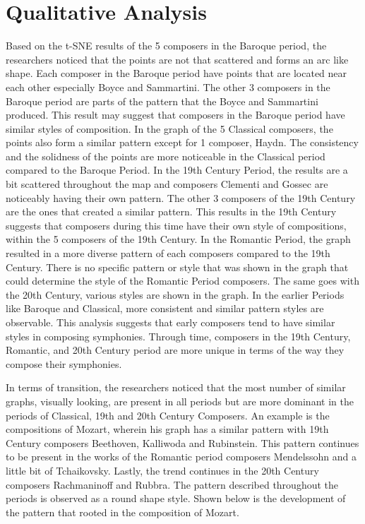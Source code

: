 \section{Qualitative Analysis}
Based on the t-SNE results of the 5 composers in the Baroque period, the researchers noticed that the points are not that scattered and forms an arc like shape. Each composer in the Baroque period have points that are located near each other especially Boyce and Sammartini. The other 3 composers in the Baroque period are parts of the pattern that the Boyce and Sammartini produced.  This result may suggest that composers in the Baroque period have similar styles of composition. In the graph of the 5 Classical composers, the points also form a similar pattern except for 1 composer, Haydn. The consistency and the solidness of the points are more noticeable in the Classical period compared to the Baroque Period. In the 19th Century Period, the results are a bit scattered throughout the map and composers Clementi and Gossec are noticeably having their own pattern. The other 3 composers of the 19th Century are the ones that created a similar pattern. This results in the 19th Century suggests that composers during this time have their own style of compositions, within the 5 composers of the 19th Century. In the Romantic Period, the graph resulted in a more diverse pattern of each composers compared to the 19th Century. There is no specific pattern or style that was shown in the graph that could determine the style of the Romantic Period composers. The same goes with the 20th Century, various styles are shown in the graph. In the earlier Periods like Baroque and Classical, more consistent and similar pattern styles are observable. This analysis suggests that early composers tend to have similar styles in composing symphonies. Through time, composers in the 19th Century, Romantic, and 20th Century period are more unique in terms of the way they compose their symphonies.

In terms of transition, the researchers noticed that the most number of similar graphs, visually looking, are present in all periods but are more dominant in the periods of Classical, 19th and 20th Century Composers. An example is the compositions of Mozart, wherein his graph has a similar pattern with 19th Century composers Beethoven, Kalliwoda and Rubinstein. This pattern continues to be present in the works of the Romantic period composers Mendelssohn and a little bit of Tchaikovsky. Lastly, the trend continues in the 20th Century composers Rachmaninoff and Rubbra. The pattern described throughout the periods is observed as a round shape style. Shown below is the development of the pattern that rooted in the composition of Mozart.

